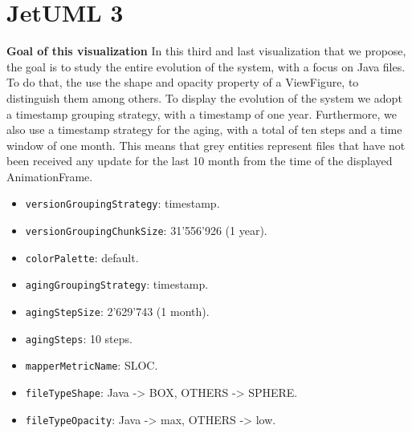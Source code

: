 \section{JetUML 3}
\textbf{Goal of this visualization}
In this third and last visualization that we propose, the goal is to study the entire evolution of the system, with a focus on Java files. 
To do that, the use the shape and opacity property of a ViewFigure, to distinguish them among others. 
To display the evolution of the system we adopt a timestamp grouping strategy, with a timestamp of one year. 
Furthermore, we also use a timestamp strategy for the aging, with a total of ten steps and a time window of one month. This means that grey entities represent files that have not been received any update for the last 10 month from the time of the displayed AnimationFrame. 
\begin{itemize}
    \item \texttt{versionGroupingStrategy}: timestamp.
    \item \texttt{versionGroupingChunkSize}: 31'556'926 (1 year). 
    \item \texttt{colorPalette}: default.
    \item \texttt{agingGroupingStrategy}: timestamp.
    \item \texttt{agingStepSize}: 2'629'743 (1 month).
    \item \texttt{agingSteps}: 10 steps. 
    \item \texttt{mapperMetricName}: SLOC. 
    \item \texttt{fileTypeShape}: Java -> BOX, OTHERS -> SPHERE. 
    \item \texttt{fileTypeOpacity}: Java -> max, OTHERS -> low. 
\end{itemize}

